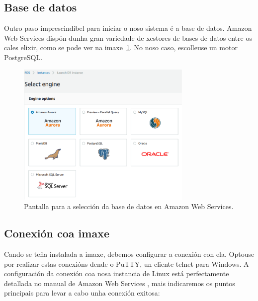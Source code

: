 \subsection{Base de datos}
Outro paso imprescindíbel para iniciar o noso sistema é a base de datos. Amazon Web Services dispón dunha gran variedade de xestores de bases de datos entre os cales elixir, como se pode ver na imaxe~\ref{fig:AWSBD}. No noso caso, escolleuse un motor PostgreSQL.

\begin{figure}[h]
	\begin{center}
		\includegraphics[width=0.75\textwidth]{figures/capturas/AWSBD}
		\caption{Pantalla para a selección da base de datos en Amazon Web Services.}
		\label{fig:AWSBD}
	\end{center}
\end{figure}

\subsection{Conexión coa imaxe}
Cando se teña instalada a imaxe, debemos configurar a conexión con ela. Optouse por realizar estas conexións dende o PuTTY, un cliente telnet para Windows. A configuración da conexión coa nosa instancia de Linux está perfectamente detallada no manual de Amazon Web Services \cite{manualAWSPutty}, mais indicaremos os puntos principais para levar a cabo unha conexión exitosa:


